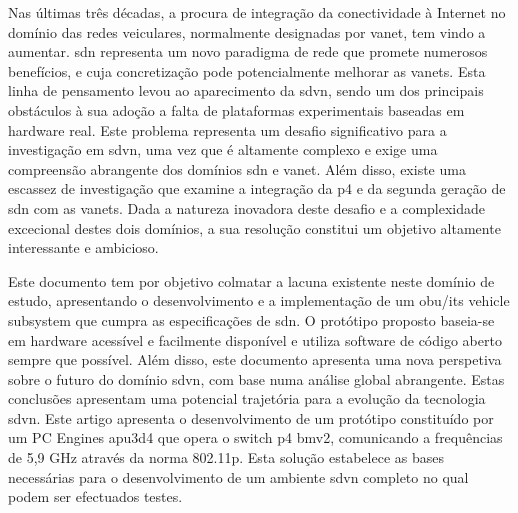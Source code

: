 
%


Nas últimas três décadas, a procura de integração da conectividade à Internet no domínio das redes veiculares, normalmente designadas por \gls{vanet}, tem vindo a aumentar. \gls{sdn} representa um novo paradigma de rede que promete numerosos benefícios, e cuja concretização pode potencialmente melhorar as \glspl{vanet}. Esta linha de pensamento levou ao aparecimento da \gls{sdvn}, sendo um dos principais obstáculos à sua adoção a falta de plataformas experimentais baseadas em hardware real. Este problema representa um desafio significativo para a investigação em \gls{sdvn}, uma vez que é altamente complexo e exige uma compreensão abrangente dos domínios \gls{sdn} e \gls{vanet}. Além disso, existe uma escassez de investigação que examine a integração da \gls{p4} e da segunda geração de \gls{sdn} com as \glspl{vanet}. Dada a natureza inovadora deste desafio e a complexidade excecional destes dois domínios, a sua resolução constitui um objetivo altamente interessante e ambicioso.

Este documento tem por objetivo colmatar a lacuna existente neste domínio de estudo, apresentando o desenvolvimento e a implementação de um \gls{obu}/\gls{its} vehicle subsystem que cumpra as especificações de \gls{sdn}. O protótipo proposto baseia-se em hardware acessível e facilmente disponível e utiliza software de código aberto sempre que possível. Além disso, este documento apresenta uma nova perspetiva sobre o futuro do domínio \gls{sdvn}, com base numa análise global abrangente. Estas conclusões apresentam uma potencial trajetória para a evolução da tecnologia \gls{sdvn}. Este artigo apresenta o desenvolvimento de um protótipo constituído por um PC Engines apu3d4 que opera o switch \gls{p4} \gls{bmv2}, comunicando a frequências de 5,9 GHz através da norma 802.11p. Esta solução estabelece as bases necessárias para o desenvolvimento de um ambiente \gls{sdvn} completo no qual podem ser efectuados testes.





